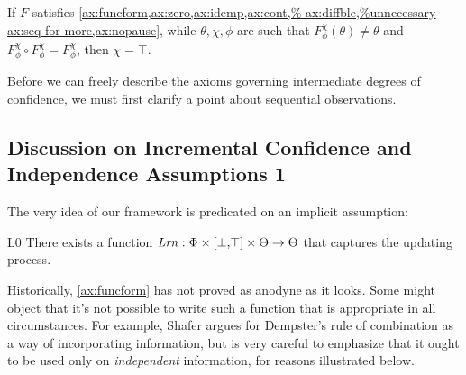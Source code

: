 \begin{subappendices}

    \begin{prop}
    	If $F$ satisfies
    	\cref{ax:funcform,ax:zero,ax:idemp,ax:cont,%
    		ax:diffble,%
    		ax:seq-for-more,ax:nopause},
    	while
     	$\theta,\chi,\phi$ are such that 
    	$F_\phi^\chi(\theta) \ne \theta$
    	and
    	$F^\chi_\phi \circ F^\chi_\phi = F^\chi_\phi$, then $\chi=\top$. 
    \end{prop}

    Before we can freely describe the axioms governing
    intermediate degrees of confidence, we must
    first clarify a point about sequential observations.


    \subsection{Discussion on Incremental Confidence and Independence Assumptions 1}
    	\label{ssec:indep-shafer}

	The very idea of our framework is predicated on an implicit assumption:

	\begin{LrnAxioms}
		\item[L0] There exists a function $\mathit{Lrn}: \Phi \times [\bot,\!\top] \times \Theta \to \Theta$ that captures the updating process.
		\label{ax:funcform}
	\end{LrnAxioms}

    Historically, \cref{ax:funcform} has not proved as anodyne as it looks.
    Some might object that it's not possible to write such a function that is appropriate in all circumstances.
    For example, Shafer argues for Dempster's rule of combination as a way of incorporating information, but is very careful to emphasize that it ought to be used only on \emph{independent} information, for reasons illustrated below.


\end{subappendices}
